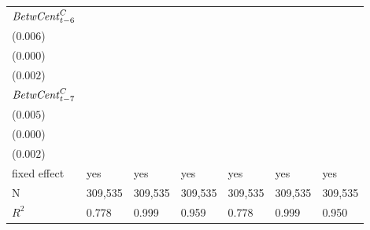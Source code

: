 \begin{tabular}{lllllll}
${\it BetwCent}^C_{t-6}$   &                             \makecell{} &                             \makecell{} &                             \makecell{} &     \makecell{$-0.004^{}$ \\ ($0.006$)} &    \makecell{$0.000^{**}$ \\ ($0.000$)} &   \makecell{$0.074^{***}$ \\ ($0.002$)} \\
${\it BetwCent}^C_{t-7}$   &                             \makecell{} &                             \makecell{} &                             \makecell{} &   \makecell{$0.028^{***}$ \\ ($0.005$)} &  \makecell{$-0.000^{***}$ \\ ($0.000$)} &   \makecell{$0.071^{***}$ \\ ($0.002$)} \\
\midrule fixed effect      &                                     yes &                                     yes &                                     yes &                                     yes &                                     yes &                                     yes \\
N                          &                                 309,535 &                                 309,535 &                                 309,535 &                                 309,535 &                                 309,535 &                                 309,535 \\
$R^2$                      &                                   0.778 &                                   0.999 &                                   0.959 &                                   0.778 &                                   0.999 &                                   0.950 \\
\bottomrule
\end{tabular}
